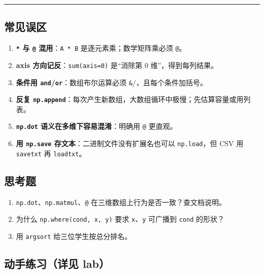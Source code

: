 \begin{center}\rule{0.5\linewidth}{0.5pt}\end{center}

\subsection{常见误区}\label{ux5e38ux89c1ux8befux533a-2}

\begin{enumerate}
\def\labelenumi{\arabic{enumi}.}
\tightlist
\item
  \textbf{\texttt{*} 与 \texttt{@} 混用}：\texttt{A\ *\ B}
  是逐元素乘；数学矩阵乘必须 \texttt{@}。
\item
  \textbf{axis 方向记反}：\texttt{sum(axis=0)} 是``消除第 0
  维''，得到每列结果。
\item
  \textbf{条件用 \texttt{and}/\texttt{or}}：数组布尔运算必须
  \texttt{\&}/\texttt{\textbar{}}，且每个条件加括号。
\item
  \textbf{反复
  \texttt{np.append}}：每次产生新数组，大数组循环中极慢；先估算容量或用列表。
\item
  \textbf{\texttt{np.dot} 语义在多维下容易混淆}：明确用 \texttt{@}
  更直观。
\item
  \textbf{用 \texttt{np.save} 存文本}：二进制文件没有扩展名也可以
  \texttt{np.load}，但 CSV 用 \texttt{savetxt} 再 \texttt{loadtxt}。
\end{enumerate}

\subsection{思考题}\label{ux601dux8003ux9898-4}

\begin{enumerate}
\def\labelenumi{\arabic{enumi}.}
\tightlist
\item
  \texttt{np.dot}、\texttt{np.matmul}、\texttt{@}
  在三维数组上行为是否一致？查文档说明。
\item
  为什么 \texttt{np.where(cond,\ x,\ y)} 要求 \texttt{x}、\texttt{y}
  可广播到 \texttt{cond} 的形状？
\item
  用 \texttt{argsort} 给三位学生按总分排名。
\end{enumerate}

\subsection{动手练习（详见
lab）}\label{ux52a8ux624bux7ec3ux4e60ux8be6ux89c1-lab-1}

